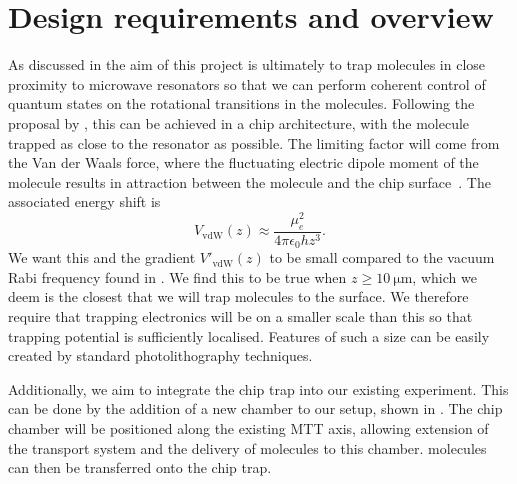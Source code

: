 \section{Design requirements and overview}
\label{overview:design}

As discussed in  the aim of this project is ultimately to
trap molecules in close proximity to microwave resonators so that we can
perform coherent control of quantum states on the rotational transitions in the
molecules.
%
Following the proposal by , this can be achieved in a chip
architecture, with the molecule trapped as close to the resonator as possible.
%
The limiting factor will come from the Van der Waals force, where the
fluctuating electric dipole moment of the molecule results in attraction
between the molecule and the chip surface~\cite{2011Ac}. The associated energy
shift is 
%
\begin{equation}
  V_\text{vdW}(z) \approx \frac{\mu_e^2}{4\pi\epsilon_0 h z^3}.
\end{equation}
%
We want this and the gradient $V'_\text{vdW}(z)$ to be small compared to the
vacuum Rabi frequency found in . We find this to
be true when $z\geq\SI{10}{\micro\meter}$, which we deem is the closest that we
will trap molecules to the surface.  We therefore require that trapping
electronics will be on a smaller scale than this so that trapping potential is
sufficiently localised.  Features of such a size can be easily created by
standard photolithography techniques.

Additionally, we aim to integrate the chip trap into our existing \CaF{}
experiment. This can be done by the addition of a new chamber to our setup,
shown in . The chip chamber will be
positioned along the existing MTT axis, allowing extension of the transport
system and the delivery of molecules to this chamber. \CaF{} molecules can then
be transferred onto the chip trap.

